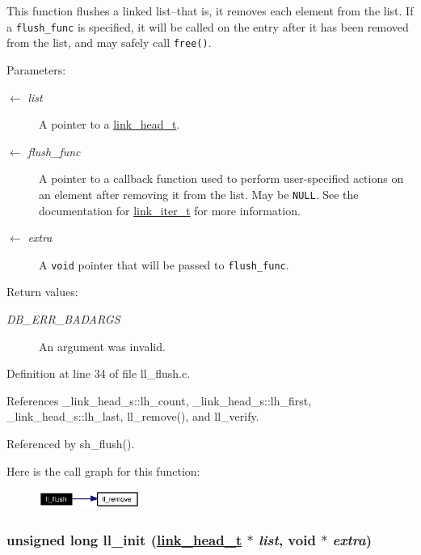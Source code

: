 This function flushes a linked list--that is, it removes each element from the list. If a {\tt flush\_\-func} is specified, it will be called on the entry after it has been removed from the list, and may safely call {\tt free()}.

\begin{Desc}
\item[Parameters:]
\begin{description}
\item[\mbox{$\leftarrow$} {\em list}]A pointer to a \hyperlink{group__dbprim__link_ga0}{link\_\-head\_\-t}. \item[\mbox{$\leftarrow$} {\em flush\_\-func}]A pointer to a callback function used to perform user-specified actions on an element after removing it from the list. May be {\tt NULL}. See the documentation for \hyperlink{group__dbprim__link_ga2}{link\_\-iter\_\-t} for more information. \item[\mbox{$\leftarrow$} {\em extra}]A {\tt void} pointer that will be passed to {\tt flush\_\-func}.\end{description}
\end{Desc}
\begin{Desc}
\item[Return values:]
\begin{description}
\item[{\em DB\_\-ERR\_\-BADARGS}]An argument was invalid.\end{description}
\end{Desc}


Definition at line 34 of file ll\_\-flush.c.

References \_\-link\_\-head\_\-s::lh\_\-count, \_\-link\_\-head\_\-s::lh\_\-first, \_\-link\_\-head\_\-s::lh\_\-last, ll\_\-remove(), and ll\_\-verify.

Referenced by sh\_\-flush().

Here is the call graph for this function:\begin{figure}[H]
\begin{center}
\leavevmode
\includegraphics[width=94pt]{group__dbprim__link_ga11_cgraph}
\end{center}
\end{figure}
\hypertarget{group__dbprim__link_ga5}{
\subsubsection[ll\_\-init]{\setlength{\rightskip}{0pt plus 5cm}unsigned long ll\_\-init (\hyperlink{struct__link__head__s}{link\_\-head\_\-t} $\ast$ {\em list}, void $\ast$ {\em extra})}}
\label{group__dbprim__link_ga5}


